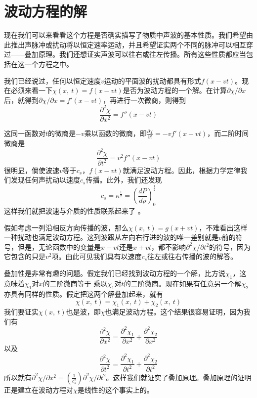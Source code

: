 \section{波动方程的解}

现在我们可以来看看这个方程是否确实描写了物质中声波的基本性质。我们希望由此推出声脉冲或扰动将以恒定速率运动，并且希望证实两个不同的脉冲可以相互穿过——叠加原理。我们还想证实声波可以往右或往左传播。所有这些性质都应当包括在这一个方程之中。

我们已经说过，任何以恒定速度$v$运动的平面波的扰动都具有形式$f(x-vt)$。现在必须来看一下$\chi (x,~t)=f(x-vt)$是否为波动方程的一个解。在计算$\partial \chi /\partial x$后，就得到$\partial\chi /\partial x =f'(x-vt)$，再进行一次微商，则得到
\begin{equation}
    \label{Eq:I:47:15}
    \frac{\partial^2\chi}{\partial x^2} = f''(x-vt)
\end{equation}

这同一函数对$t$的微商是$-v$乘以函数的微商，即$\frac{\partial\chi}{\partial t}=-vf'(x-vt)$，而二阶时间微商是
\begin{equation}
    \label{Eq:I:47:16}
    \frac{\partial^2\chi}{\partial t^2} = v^2 f''(x-vt)
\end{equation}
很明显，倘使波速$v$等于$c_s$，$f(x-vt)$就满足波动方程。因此，根据力学定律我们发现任何声扰动以速度$c_s$传播。此外，我们还发现
\begin{equation*}
    c_s = \kappa^{\frac{1}{2}}=\left(\frac{dP}{d\rho}\right)^{\frac{1}{2}}_0
\end{equation*}
这样我们就把波速与介质的性质联系起来了 。

假如考虑一列沿相反方向传播的波，那么$\chi(x,~t)=g(x+vt)$，不难看出这样一种扰动也满足波动方程。这列波跟从左向右行进的波的唯一差别就是$v$前的符号，但是，无论函数中的变量是$x-vt$还是$x+vt$，都不影响$\partial^2 \chi /\partial t^2$的符号，因为它包含的只是$v^2$项。由此可见我们具有以速度$c_s$往左或往右传播的波的解答。

叠加性是非常有趣的问题。假定我们已经找到波动方程的一个解，比方说$\chi_1$，这意味着$\chi_1$对$x$的二阶微商等于 乘以$\chi_1$对$t$的二阶微商。现在如果有任意另一个解$\chi_2$亦具有同样的性质。假定把这两个解叠加起来，就有
\begin{equation}
    \label{Eq:I:47:17}
    \chi(x,~t)=\chi_1(x,~t)+\chi_2(x,~t)
\end{equation}
我们要证实$\chi(x,~t)$也是波，即$\chi$也满足波动方程。这个结果很容易证明，因为我们有
\begin{equation}
    \label{Eq:I:47:18}
    \frac{\partial^2\chi}{\partial x^2} = \frac{\partial^2\chi_1}{\partial x^2} + \frac{\partial^2\chi_2}{\partial x^2}
\end{equation}
以及
\begin{equation}
    \label{Eq:I:47:19}
    \frac{\partial^2\chi}{\partial t^2} = \frac{\partial^2\chi_1}{\partial t^2} + \frac{\partial^2\chi_2}{\partial t^2}
\end{equation}
所以就有$\partial^2\chi/\partial x^2 = \left(\frac{1}{c_s^2}\right)\partial^2\chi/\partial t^2$。这样我们就证实了叠加原理。叠加原理的证明正是建立在波动方程对$\chi$是线性的这个事实上的。

